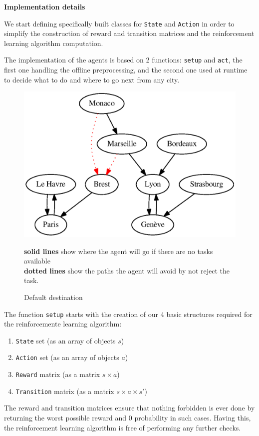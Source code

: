\documentclass[11pt,a4paper]{article}
\begin{document}
\bigskip
\textbf{Implementation details}

We start defining specifically built classes for \texttt{State} and
\texttt{Action} in order to simplify the construction of reward and transition
matrices and the reinforcement learning algorithm computation.

The implementation of the agents is based on 2 functions: \texttt{setup} and
\texttt{act}, the first one handling the offline preprocessing, and the second
one used at runtime to decide what to do and where to go next from any city.

\begin{figure}
    \includegraphics[width=.6\textwidth]{graph.eps}
    \caption{Default destination}{\textbf{solid lines} show where the agent will go if
        there are no tasks available\\\textbf{dotted lines} show the paths the agent
        will avoid by not reject the task.}
    \label{fig:graph}
\end{figure}

The function \texttt{setup} starts with the creation of our 4 basic structures
required for the reinforcemente learning algorithm:

\begin{enumerate}
    \item{\texttt{State} set (as an array of objects $s$)}
    \item{\texttt{Action} set (as an array of objects $a$)}
    \item{\texttt{Reward} matrix (as a matrix $s \times a$)}
    \item{\texttt{Transition} matrix (as a matrix $s \times a \times s'$)}
\end{enumerate}

The reward and transition matrices ensure that nothing forbidden is ever done
by returning the worst possible reward and $0$ probability in such cases. Having
this, the reinforcement learning algorithm is free of performing any further
checks.
\end{document}
